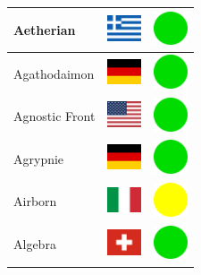 \documentclass[12pt, a4paper, twoside]{report}
\begin{document}
\begin{center}
\begin{longtable}{|p{5cm}|p{2cm}|p{2cm}|}
 Aetherian                                                  & \includegraphics[width=1cm]{4x3/gr} &   \includegraphics[width=1cm]{likes/y} \\ \hline
 Agathodaimon                                               & \includegraphics[width=1cm]{4x3/de} &   \includegraphics[width=1cm]{likes/y} \\ \hline
 Agnostic Front                                             & \includegraphics[width=1cm]{4x3/us} &   \includegraphics[width=1cm]{likes/y} \\ \hline
 Agrypnie                                                   & \includegraphics[width=1cm]{4x3/de} &   \includegraphics[width=1cm]{likes/y} \\ \hline
 Airborn                                                    & \includegraphics[width=1cm]{4x3/it} &   \includegraphics[width=1cm]{likes/m} \\ \hline
 Algebra                                                    & \includegraphics[width=1cm]{4x3/ch} &   \includegraphics[width=1cm]{likes/y} \\ \hline

\end{longtable}
\end{center}
\end{document}
